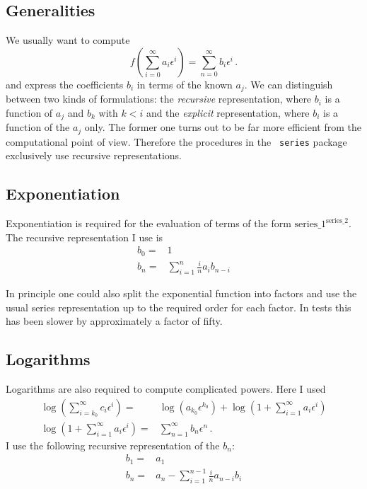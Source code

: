 \documentclass[titlepage]{article}
\begin{document}
\subsection{Generalities}
\label{sec:impl_general}


 We usually want to compute
\begin{equation}
  \label{eq:def}
  f\left(\sum_{i=0}^{\infty}a_i \epsilon^i\right)=\sum_{n=0}^\infty b_i \epsilon^i\,.
\end{equation}
and express the coefficients $b_i$ in terms of the known $a_j$. We can
distinguish between two kinds of formulations: the {\it recursive} representation,
where $b_i$ is a function of $a_j$ and $b_k$ with $k < i$ and the {\it
  explicit} representation, where $b_i$ is a function of the $a_j$ only.
The former one turns out to be far more efficient from the
computational point of view. Therefore the procedures in the {\tt
  series} package exclusively use recursive representations.

\subsection{Exponentiation}
\label{sec:impl_exp}

Exponentiation is required for the evaluation of terms of the form
$\text{series\_1}^{\text{series\_2}}$.
The recursive representation I use is
\begin{align}
  \label{eq:exp_rec}
b_0=&1\\
b_n =&  \sum_{i=1}^{n} \frac{i}{n} a_{i}b_{n-i}
\end{align}

In principle one could also split the exponential function into factors
and use the usual series representation up to the required order for
each factor. In tests this has been slower by approximately a factor of fifty.

\subsection{Logarithms}
\label{sec:impl_log}

Logarithms are also required to compute complicated powers. Here I used
\begin{align}
  \label{eq:log}
\log\left(\sum_{i=k_0}^{\infty}c_i \epsilon^i\right)=&\log\left(a_{k_0}\epsilon^{k_0}\right)+\log\left(1+\sum_{i=1}^{\infty}a_i \epsilon^i\right)\\
\log\left(1+\sum_{i=1}^{\infty}a_i \epsilon^i\right)=&\sum_{n=1}^\infty
b_n\epsilon^n\,.
\end{align}
I use the following recursive representation of the $b_n$:
\begin{align}
  \label{eq:log_rec}
b_1=&a_1\\
b_n =& a_n - \sum_{i=1}^{n-1} \frac{i}{n} a_{n-i}b_{i}
\end{align}
\end{document}
